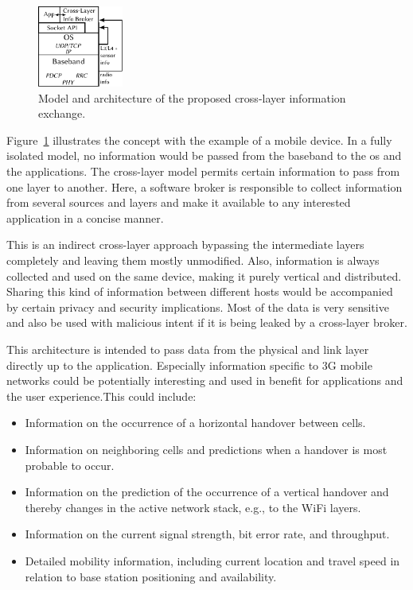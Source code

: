 \begin{figure}[htb]
	\centering
	\includegraphics[width=0.25\textwidth]{images/cross-layer-model.pdf}
	\caption{Model and architecture of the proposed cross-layer information exchange.}
\label{c5:fig:crosslayer-model}
\end{figure}

Figure~\ref{c5:fig:crosslayer-model} illustrates the concept with the example of a mobile device. In a fully isolated model, no information would be passed from the baseband to the \gls{os} and the applications. The cross-layer model permits certain information to pass from one layer to another. Here, a software broker is responsible to collect information from several sources and layers and make it available to any interested application in a concise manner. 

This is an indirect cross-layer approach bypassing the intermediate layers completely and leaving them mostly unmodified. Also, information is always collected and used on the same device, making it purely vertical and distributed. Sharing this kind of information between different hosts would be accompanied by certain privacy and security implications. Most of the data is very sensitive and also be used with malicious intent if it is being leaked by a cross-layer broker.

This architecture is intended to pass data from the physical and link layer directly up to the application. Especially information specific to \gls{3G} mobile networks could be potentially interesting and used in benefit for applications and the user experience.This could include:

\begin{itemize}
	\item Information on the occurrence of a horizontal handover between cells.

	\item Information on neighboring cells and predictions when a handover is most probable to occur.

	\item Information on the prediction of the occurrence of a vertical handover and thereby changes in the active network stack, e.g., to the WiFi layers.

	\item Information on the current signal strength, bit error rate, and throughput.

	\item Detailed mobility information, including current location and travel speed in relation to base station positioning and availability.
\end{itemize}

